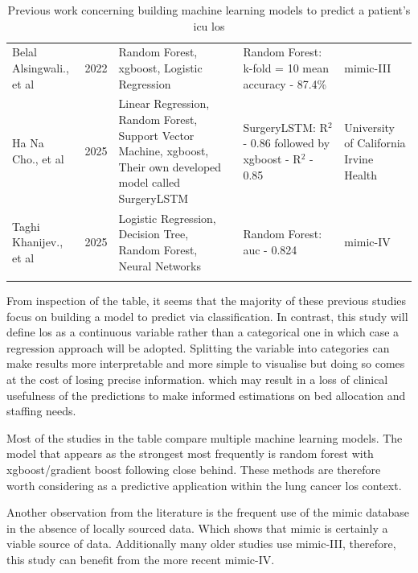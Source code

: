 \documentclass[11pt]{article}
\begin{document}
{{\begin{center}
\begin{longtable}{ |L{2cm} | L{1cm} | L{4cm} | 
 L{6cm} | L{2cm} |}
 Belal Alsingwali., et al \cite{Alsinglawi123} & 2022 & Random Forest, \gls{xgboost}, Logistic Regression & Random Forest: k-fold = 10 mean accuracy - 87.4\% &
 \gls{mimic}-III\\ 
    \noalign{\global\setlength{\arrayrulewidth}{0.05mm}}
    \hline
    \noalign{\global\setlength{\arrayrulewidth}{0.7mm}}
 Ha Na Cho., et al \cite{NaCho2025}  & 2025 & Linear Regression, Random Forest, Support Vector Machine, \gls{xgboost}, Their own developed model called SurgeryLSTM & SurgeryLSTM: R$^2$ - 0.86 followed by \gls{xgboost} - R$^2$ - 0.85 &
University of California Irvine Health\\ 
    \noalign{\global\setlength{\arrayrulewidth}{0.05mm}}
    \hline
    \noalign{\global\setlength{\arrayrulewidth}{0.7mm}}
 Taghi Khanijev., et al \cite{Khaniyev2028}  & 2025 & Logistic Regression, Decision Tree, Random Forest, Neural Networks & Random Forest: \gls{auc} - 0.824 &
 \gls{mimic}-IV\\ 
    \hline


\caption[Literature review]{Previous work concerning building machine learning models to predict a patient's \gls{icu} \gls{los}}
\label{tab:my_label}\\
\end{longtable}
\end{center}}}
\normalsize

From inspection of the table, it seems that the majority of these previous studies focus on building a model to predict via classification. In contrast, this study will define \gls{los} as a continuous variable rather than a categorical one in which case a regression approach will be adopted. Splitting the variable into categories can make results more interpretable and more simple to visualise but doing so comes at the cost of losing precise information\cite{Altman2006}. which may result in a loss of clinical usefulness of the predictions to make informed estimations on bed allocation and staffing needs.

Most of the studies in the table compare multiple machine learning models. The model that appears as the strongest most frequently is random forest with \gls{xgboost}/gradient boost following close behind. These methods are therefore worth considering as a predictive application within the lung cancer \gls{los} context.

Another observation from the literature is the frequent use of the \gls{mimic} database in the absence of locally sourced data. Which shows that \gls{mimic} is certainly a viable source of data. Additionally many older studies use \gls{mimic}-III, therefore, this study can benefit from the more recent \gls{mimic}-IV.
\end{document}
